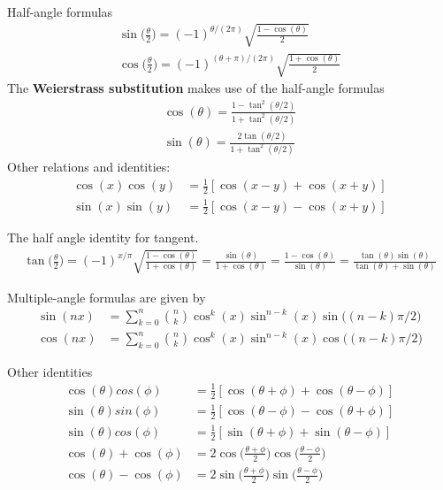 \begin{multicols}{2}
\begin{align}
\end{align}
Half-angle formulas
\begin{align}
\sin\bigg(\frac{\theta}{2}\bigg)=(-1)^{\theta/(2\pi)}\sqrt{\frac{1-\cos(\theta)}{2}} \\
\cos\bigg(\frac{\theta}{2}\bigg)=(-1)^{(\theta+\pi)/(2\pi)}\sqrt{\frac{1+\cos(\theta)}{2}}
\end{align}
The \textbf{Weierstrass substitution} makes use of the half-angle formulas 
\begin{align}
\cos(\theta)=\frac{1-\tan^2(\theta/2)}{1+\tan^2(\theta/2)} \\
\sin(\theta)=\frac{2\tan(\theta/2)}{1+\tan^2(\theta/2)}
\end{align}
Other relations and identities:
\begin{align}
	\cos(x)\cos(y) &= \frac{1}{2}[\cos(x-y)+\cos(x+y)] \\
	\sin(x)\sin(y) &= \frac{1}{2}[\cos(x-y)-\cos(x+y)]
\end{align}
\end{multicols}
The half angle identity for tangent.
\begin{align}
\tan\bigg(\frac{\theta}{2}\bigg)=(-1)^{x/\pi}\sqrt{\frac{1-\cos(\theta)}{1+\cos(\theta)}} = \frac{\sin(\theta)}{1+\cos(\theta)}=\frac{1-\cos(\theta)}{\sin(\theta)}=\frac{\tan(\theta)\sin(\theta)}{\tan(\theta)+\sin(\theta)}
\end{align}

Multiple-angle formulas are given by 
\begin{align}
\sin(nx)&= \sum_{k=0}^{n}{{n}\choose{k}}\cos^k(x)\sin^{n-k}(x)\sin\big((n-k)\pi/2 \big) \\
\cos(nx)&= \sum_{k=0}^{n}{{n}\choose{k}}\cos^k(x)\sin^{n-k}(x)\cos\big((n-k)\pi/2 \big)
\end{align}

Other identities
\begin{align}
\cos(\theta)cos(\phi) &=\frac{1}{2}[\cos(\theta+\phi)+\cos(\theta-\phi)] \\
\sin(\theta)sin(\phi) &=\frac{1}{2}[\cos(\theta-\phi)-\cos(\theta+\phi)] \\
\sin(\theta)cos(\phi) &=\frac{1}{2}[\sin(\theta+\phi)+\sin(\theta-\phi)] \\
\cos(\theta)+\cos(\phi)&= 2\cos\bigg( \frac{\theta+\phi}{2}\bigg)\cos\bigg( \frac{\theta-\phi}{2}\bigg) \\
\cos(\theta)-\cos(\phi)&= 2\sin\bigg( \frac{\theta+\phi}{2}\bigg)\sin\bigg( \frac{\theta-\phi}{2}\bigg)
\end{align}

